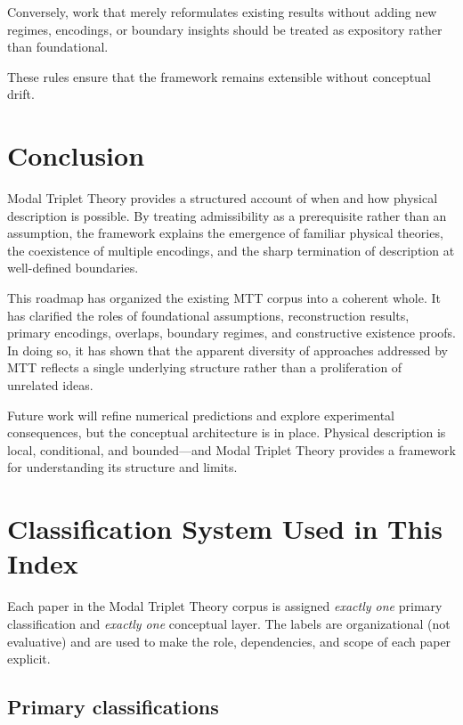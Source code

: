 \documentclass[11pt]{article}
\begin{document}
Conversely, work that merely reformulates existing results without adding new regimes, encodings, or boundary insights should be treated as expository rather than foundational.

These rules ensure that the framework remains extensible without conceptual drift.

\section{Conclusion}

Modal Triplet Theory provides a structured account of when and how physical description is possible. By treating admissibility as a prerequisite rather than an assumption, the framework explains the emergence of familiar physical theories, the coexistence of multiple encodings, and the sharp termination of description at well-defined boundaries.

This roadmap has organized the existing MTT corpus into a coherent whole. It has clarified the roles of foundational assumptions, reconstruction results, primary encodings, overlaps, boundary regimes, and constructive existence proofs. In doing so, it has shown that the apparent diversity of approaches addressed by MTT reflects a single underlying structure rather than a proliferation of unrelated ideas.

Future work will refine numerical predictions and explore experimental consequences, but the conceptual architecture is in place. Physical description is local, conditional, and bounded—and Modal Triplet Theory provides a framework for understanding its structure and limits.

\section{Classification System Used in This Index}

Each paper in the Modal Triplet Theory corpus is assigned \emph{exactly one} primary
classification and \emph{exactly one} conceptual layer. The labels are organizational (not
evaluative) and are used to make the role, dependencies, and scope of each paper explicit.

\subsection{Primary classifications}
\end{document}
